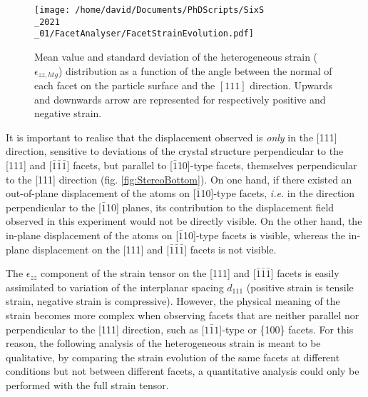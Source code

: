 \begin{figure}[!htb]
    \centering
    \texttt{[image: /home/david/Documents/PhDScripts/SixS\\\_2021\\\_01/FacetAnalyser/FacetStrainEvolution.pdf]}
    \caption{
        Mean value and standard deviation of the heterogeneous strain ($\epsilon_{zz, htg}$) distribution as a function of the angle between the normal of each facet on the particle surface and the $[111]$ direction.
        Upwards and downwards arrow are represented for respectively positive and negative strain.
    }
    \label{fig:AmaterasuStrain}
\end{figure}

It is important to realise that the displacement observed is \textit{only} in the [111] direction, sensitive to deviations of the crystal structure perpendicular to the [111] and [$\bar{1}\bar{1}\bar{1}$] facets, but parallel to [$\bar{1}$10]-type facets, themselves perpendicular to the [111] direction (fig. \ref{fig:StereoBottom}).
On one hand, if there existed an out-of-plane displacement of the atoms on [$\bar{1}$10]-type facets, \textit{i.e.} in the direction perpendicular to the [$\bar{1}$10] planes, its contribution to the displacement field observed in this experiment would not be directly visible.
On the other hand, the in-plane displacement of the atoms on [$\bar{1}$10]-type facets is visible, whereas the in-plane displacement on the [111] and [$\bar{1}\bar{1}\bar{1}$] facets is not visible.

The $\epsilon_{zz}$ component of the strain tensor on the [111] and [$\bar{1}\bar{1}\bar{1}$] facets is easily assimilated to variation of the interplanar spacing $d_{111}$ (positive strain is tensile strain, negative strain is compressive).
However, the physical meaning of the strain becomes more complex when observing facets that are neither parallel nor perpendicular to the [111] direction, such as [$1\bar{1}1$]-type or \{100\} facets.
For this reason, the following analysis of the heterogeneous strain is meant to be qualitative, by comparing the strain evolution of the same facets at different conditions but not between different facets, a quantitative analysis could only be performed with the full strain tensor.

